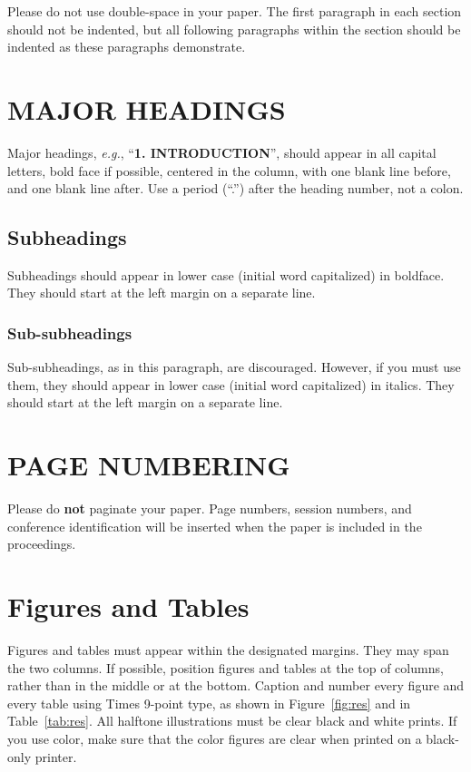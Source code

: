 \documentclass[a4paper]{article}
\begin{document}
Please do not use double-space in your paper. The first paragraph in each section should not be indented, but all following paragraphs within the section should be indented as these paragraphs demonstrate.


\section{MAJOR HEADINGS}
\label{sec:majhead}

Major headings, \textit{e.g.}, ``\textbf{1. INTRODUCTION}'', should appear in all capital
letters, bold face if possible, centered in the column, with one blank line
before, and one blank line after. Use a period (``.'') after the heading number,
not a colon.

\subsection{Subheadings}
\label{ssec:subhead}

Subheadings should appear in lower case (initial word capitalized) in
boldface.  They should start at the left margin on a separate line.

\subsubsection{Sub-subheadings}
\label{sssec:subsubhead}
Sub-subheadings, as in this paragraph, are discouraged. However, if you
must use them, they should appear in lower case (initial word
capitalized) in italics. They should start at the left margin on a separate line.


\section{PAGE NUMBERING}
\label{sec:page}

Please do {\bf not} paginate your paper.  Page numbers, session numbers, and
conference identification will be inserted when the paper is included in the
proceedings.

\section{Figures and Tables}
\label{sec:illust}

Figures and tables must appear within the designated margins.  They may span the two columns.  If possible, position figures and tables at the top of columns, rather than in the middle or at the bottom. Caption and number every figure and every table using Times 9-point type, as shown in Figure~\ref{fig:res} and in Table~\ref{tab:res}. All halftone illustrations must be clear black and white prints.  If you use color, make sure that the color figures are clear when printed on a black-only printer.
\end{document}
